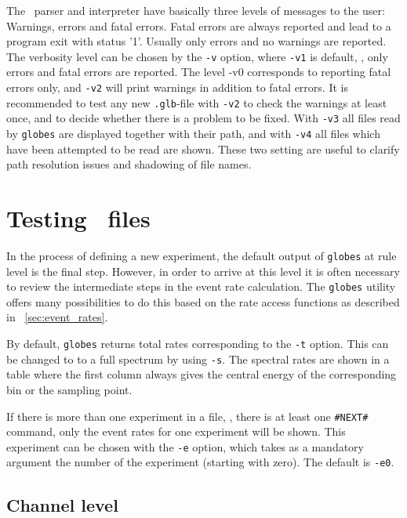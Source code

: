 The \AEDL\ parser and interpreter have basically three levels of messages to
the user: Warnings, errors and fatal errors. 
Fatal errors are always reported and lead to a 
program exit with status '1'. Usually only errors and no warnings
are reported. The verbosity level can be chosen by the {\tt -v} option, where {\tt -v1} is default, \ie, only errors and fatal errors are reported. The level {-v0} corresponds to reporting fatal errors only, and {\tt -v2} will print warnings in addition to fatal errors. It is recommended
to test any new {\tt .glb}-file with {\tt -v2} to check the warnings at least once, and to decide whether there is a problem to be fixed. With {\tt -v3} all files read by {\tt globes} are displayed together with their path, and with  {\tt -v4} all files which have been attempted to be read are shown.
These two setting are useful to clarify path resolution issues and shadowing
of file names.

\section{Testing \AEDL\ files}
\label{sec:globes_test}

In the process of defining a new experiment, the default output of {\tt globes} at rule level is the final step. However, in order to arrive 
at this level it is often necessary to review the intermediate steps in the event rate calculation. The {\tt globes} utility offers many possibilities to do this based on the rate access functions as described in \Sec~\ref{sec:event_rates}.

By default, {\tt globes} returns total rates corresponding to the 
{\tt -t} option. This can be changed to
to a full spectrum by using {\tt -s}. The spectral rates are shown in a
table where the first column always gives the central energy of the
corresponding bin or the sampling point.

If there is more than one experiment in a file, \ie, there is at least one 
{\tt \#NEXT\#} command, only the event rates for one experiment will be shown.  This experiment can be chosen with the {\tt -e} option, which takes 
as a mandatory argument the number of the experiment (starting with zero).
The default is {\tt -e0}.

\subsection*{Channel level}

